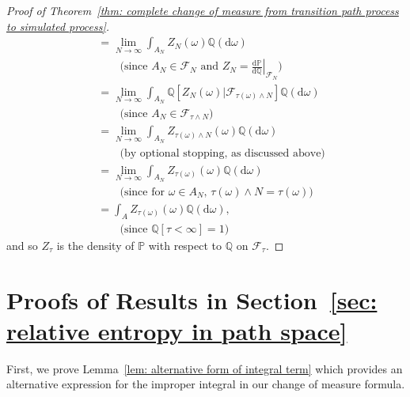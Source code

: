 \documentclass[reqno]{amsart}
\newcommand{\1}{\mathds{1}}
\renewcommand{\d}{\mathrm{d}}
\renewcommand{\P}{\mathds{P}}
\newcommand{\Q}{\mathds{Q}}
\newcommand{\F}{\mathcal{F}}
\theoremstyle{definition}
\theoremstyle{remark}
\begin{document}
\begin{proof}[Proof of Theorem~\ref{thm: complete change of measure from transition path process to simulated process}]
\begin{align*}
          &=\lim_{N \rightarrow \infty} \int_{A_N} Z_N(\omega) \Q (\d \omega) \\
          &\qquad \text{(since $A_N \in \F_N$ and $Z_N = \left .  \frac{\d \P}{\d \Q} \right \rvert_{\F_N}$)} \\
          &= \lim_{N \rightarrow \infty}  \int_{A_N} \Q[Z_N(\omega) \vert \F_{\tau(\omega) \wedge N}] \Q(\d \omega) \\
          &\qquad  \text{(since $A_N \in \F_{\tau \wedge N}$)} \\\
          &=  \lim_{N \rightarrow \infty} \int_{A_N} Z_{\tau (\omega) \wedge N}(\omega) \Q(\d \omega) \\
          &\qquad  \text{(by optional stopping, as discussed above)} \\
          &=   \lim_{N \rightarrow \infty} \int_{A_N} Z_{\tau (\omega) }(\omega) \Q(\d \omega) \\
          &\qquad  \text{(since for $\omega \in A_N$, $\tau(\omega) \wedge N = \tau(\omega)$)} \\
          &= \int_A Z_{\tau (\omega)}(\omega) \Q(\d \omega), \\
          &\qquad \text{(since $\Q[\tau < \infty ]=1$)}
  \end{align*}
  and so $Z_\tau$ is the density of $\P$ with respect to $\Q$ on $\F_\tau$. 
\end{proof}


\section{Proofs of Results in Section~\ref{sec: relative entropy in path space}}
\label{sec: proofs relative entropy}

First, we prove Lemma~\ref{lem: alternative form of integral term} which provides an alternative expression for the improper integral in our change of measure formula. 
\end{document}
